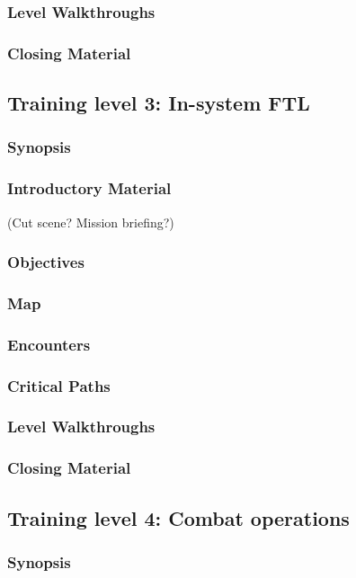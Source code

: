 \subsubsection{Level Walkthroughs}
\subsubsection{Closing Material}

\subsection{Training level 3: In-system FTL}
\subsubsection{Synopsis}
\subsubsection{Introductory Material}
 (Cut scene?  Mission briefing?)
\subsubsection{Objectives}
\subsubsection{Map}
\subsubsection{Encounters}
\subsubsection{Critical Paths}
\subsubsection{Level Walkthroughs}
\subsubsection{Closing Material}

\subsection{Training level 4: Combat operations}
\subsubsection{Synopsis}
